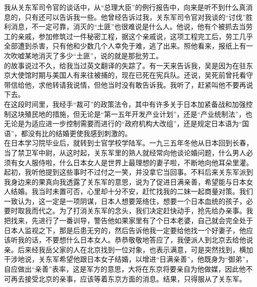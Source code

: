 我从关东军司令官的谈话中，从“总理大臣”的例行报告中，向来是听不到什么真消息的，只有还可以告诉我一些。他曾经告诉过我，关东军司令官对我谈的“讨伐”胜利消息，不一定可靠，消灭的“土匪”也很难说是什么人。他说，他有个被抓去当劳工的亲戚，参加修筑过一件秘密工程，据这个亲戚说，这项工程完工后，劳工几乎全部遭到杀害，只有他和少数几个人幸免于难，逃了出来。照他看来，报纸上有一次吹嘘某地消灭了多少“土匪”，说的就是那批劳工。\\

的故事说过不久，给我当过英文翻译的失踪了。有一天来告诉我，吴是因为在驻东京大使馆时期与美国人有来往被捕的，现在已死在宪兵队。还说，吴死前曾托看守带信给他，求他转请我说情，但他当时没有敢告诉我。我听了，赶紧叫他不要再说下去。\\

在这段时间里，我经手“裁可”的政策法令，其中有许多关于日本加紧备战和加强控制这块殖民地的措施，但无论是“第一五年开发产业计划”，还是“产业统制法”，也无论是为适应进一步控制需要而进行的“政府机构大改组”，还是规定日本语为“国语”，都没有比的结婚更使我感到刺激的。\\

在日本学习院毕业后，就转到士官学校学陆军。一九三五年冬他从日本回到长春，当了禁卫军中尉，从这时起，关东军里的熟人就经常向他谈论婚问题，什么男人必须有女人服侍啦，什么日本女人是世界上最理想的妻子啦，不断地向他耳朵里灌。起初，我听他提到这些事时不过付之一笑，并没拿它当回事。不料后来关东军派到我身边来的果真向我透露了关东军的意思，说为了促进日满亲善，希望能与日本女人结婚。我当时未置可否，心里却十分不安，赶忙找我的二妹一起商量对策。我们一致认为，这一定是一项阴谋，日本人想要笼络住，想要一个日本血统的孩子，必要时取我而代之。为了打消关东军的念头，我们决定赶快动手，抢先给办亲事。我把找来，先进行了一番训导，警告他如果家里有了个日本老婆，自己就会完全处于日本人监视之下，那是后患无穷的，然后告诉他我一定要给他找一个好妻子，他应该听我的话，不要想什么日本女人。恭恭敬敬地答应了，我便派人到北京去给他说亲。后来经我岳父家的人在北京找到一位对象，也表示满意，可是突然找到，横加干涉地说，关东军希望他跟日本女子结婚，以增进“日满亲善”，他既身为“御弟”，自应做出“亲善”表率，这是军方的意思，大将在东京将要亲自为他做媒，因此他不可再去接受北京的亲事，应该等着东京方面的消息。结果，只得服从了关东军。\\

